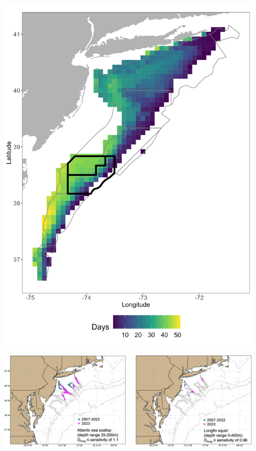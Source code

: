 \documentclass[
  10pt,
]{article}
\let\origfigure\figure
\let\endorigfigure\endfigure
\renewenvironment{figure}[1][2] {
    \expandafter\origfigure\expandafter[H]
} {
    \endorigfigure
}
\begin{document}
\begin{figure}

{\centering \includegraphics[width=0.6\linewidth]{images/bottom_temp_threshold_17_19_Elephant_Trunk} 

}

\caption{The number of days in 2022 where bottom temperature was between 17 and 19 ℃  (sressful thermal temperatures for sea scallops)in each GLORYS grid cell. The gray lines show the sea scallop estimation areas, with the Elephant Trunk region highlighted in black lines.}\label{fig:scallop-thermal-2022}
\end{figure}

\begin{figure}

{\centering \includegraphics[width=1\linewidth]{images/Figure6_GraceSaba_2024} 

}

\caption{Left: Mission tracks of three gliders deployed off the coast of New Jersey in August and September of 2023. Right: Locations of hypoxic levels of dissolved oxygen (magenta; < 3 mg/liter) and low aragonite saturation state (cyan; < 1) measured along the glider mission tracks and locations of reported fish, lobster, and/or crab mortalities (red X).}\label{fig:hypoxia-2023}
\end{figure}
\end{document}
